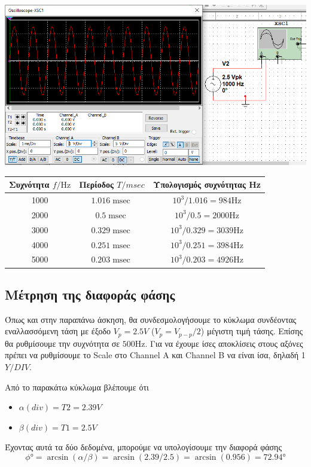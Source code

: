 \documentclass{article}
\begin{document}
\includegraphics[width=\textwidth]{./res/ex3circ.png} \\

\begin{center}
\begin{tabular}{|c|c|c|}
        \hline
        Συχνότητα  $f / \si{\hertz}$ &
        Περίοδος $T / \si{msec}$ &
        Υπολογισμός συχνότητας \si{\hertz} \\
        \hline
        1000 & $1.016\si{\milli\sec}$ & $10^3 / 1.016 = 984\si{\hertz}$ \\
        \hline
        2000 & $0.5\si{\milli\sec}$ & $10^3 / 0.5 = 2000\si{\hertz}$ \\
        \hline
        3000 & $0.329\si{\milli\sec}$ & $10^3 / 0.329 = 3039\si{\hertz}$ \\
        \hline
        4000 & $0.251\si{\milli\sec}$ & $10^3 / 0.251 = 3984\si{\hertz}$ \\
        \hline
        5000 & $0.203\si{\milli\sec}$ & $10^3 / 0.203 = 4926\si{\hertz}$ \\
        \hline
\end{tabular}
\end{center}

\subsection{Μέτρηση της διαφοράς φάσης}
Όπως και στην παραπάνω άσκηση, θα συνδεσμολογήσουμε το κύκλωμα συνδέοντας
εναλλασσόμενη τάση με έξοδο $V_p = 2.5V$ ($V_{p} = V_{p-p} / 2$) μέγιστη τιμή τάσης. 
Επίσης θα ρυθμίσουμε την συχνότητα σε $500\si{\hertz}$. Για να έχουμε ίσες αποκλίσεις
στους αξόνες πρέπει να ρυθμίσουμε το Scale στο Channel A και Channel B να είναι ίσα,
δηλαδή 1 $Y / DIV$.

Από το παρακάτω κύκλωμα βλέπουμε ότι
\begin{itemize}
        \item
        $α(div) = T2 = 2.39V$
        \item
        $β(div) = T1 = 2.5V$
\end{itemize}
Έχοντας αυτά τα δύο δεδομένα, μπορούμε να υπολογίσουμε την διαφορά φάσης
\[\si{\phi\degree} = \arcsin(α/β) = \arcsin(2.39 / 2.5) = \arcsin(0.956) = 72.94\si{\degree}\]
\end{document}
